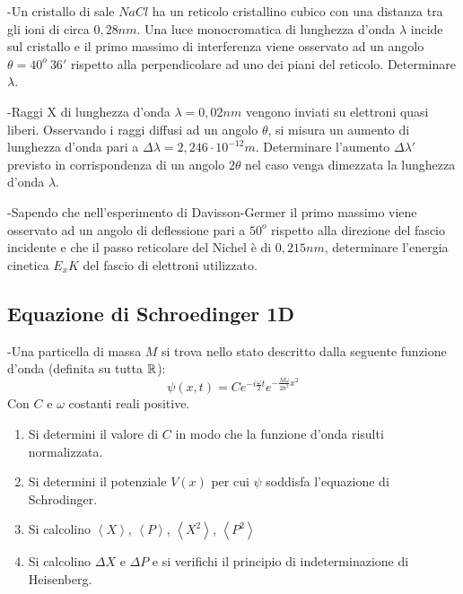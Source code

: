 \documentclass[12pt,twoside,a4]{article}
\begin{document}
\begin{esercizio}
	-Un cristallo di sale $NaCl$ ha un reticolo cristallino cubico con una distanza tra gli ioni di circa $0,28 nm$. Una luce monocromatica di lunghezza d'onda $\lambda$ incide sul cristallo e il primo massimo di interferenza viene osservato ad un angolo $\theta = 40^o \ 36'$ rispetto alla perpendicolare ad uno dei piani del reticolo. Determinare $\lambda$.
\end{esercizio}

\begin{esercizio}
	-Raggi X di lunghezza d'onda $\lambda=0,02nm$ vengono inviati su elettroni quasi liberi. Osservando i raggi diffusi ad un angolo $\theta$, si misura un aumento di lunghezza d'onda pari a $\Delta \lambda = 2,246 \cdot 10^{-12}m$. Determinare l'aumento $\Delta \lambda'$ previsto in corrispondenza di un angolo $2 \theta$ nel caso venga dimezzata la lunghezza d'onda $\lambda$.
\end{esercizio}

\newpage
\begin{esercizio}
	-Sapendo che nell'esperimento di Davisson-Germer il primo massimo viene osservato ad un angolo di deflessione pari a $50^o$ rispetto alla direzione del fascio incidente e che il passo reticolare del Nichel è di $0,215 nm$, determinare l'energia cinetica $E_xK$ del fascio di elettroni utilizzato.
\end{esercizio}



\newpage
\subsection{Equazione di Schroedinger 1D}
\begin{esercizio}
	-Una particella di massa $M$ si trova nello stato descritto dalla seguente funzione d'onda (definita su tutta $\mathbb{R}$):
\begin{equation*}
	\psi(x,t)=Ce^{-i \frac{\omega}{2}t}e^{- \frac{M\omega}{2 \hbar^2}x^2}
\end{equation*}
Con $C$ e $\omega$ costanti reali positive.
\begin{enumerate}[label=(\textit{\roman*})]
	\item Si determini il valore di $C$ in modo che la funzione d'onda risulti normalizzata.
	\item Si determini il potenziale $V(x)$ per cui $\psi$ soddisfa l'equazione di Schrodinger.
	\item Si calcolino $\left< X\right>$, $\left< P\right>$, $\left< X^2\right>$, $\left< P^2\right>$
	\item Si calcolino $\Delta X$ e $\Delta P$ e si verifichi il principio di indeterminazione di Heisenberg.
\end{enumerate}
\end{esercizio}
\end{document}
